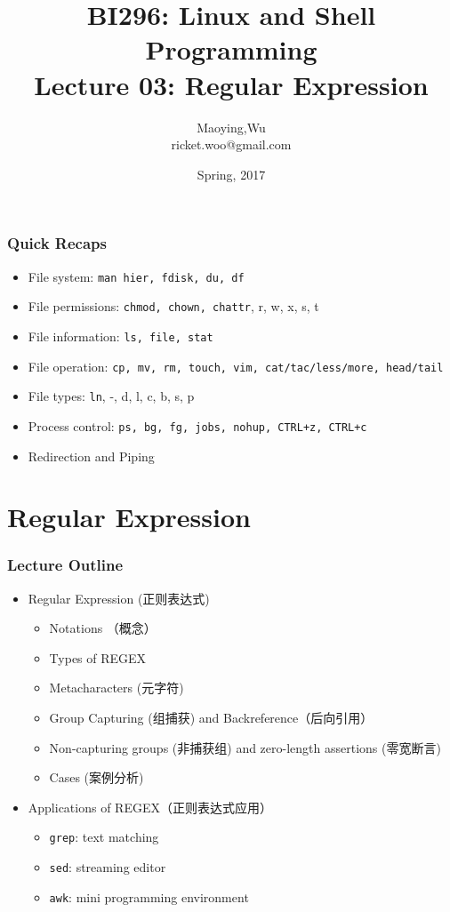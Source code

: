 \documentclass[red]{beamer}
\title[BI296-Lec03]{\tiny{BI296: Linux and Shell Programming}\\
\Large{Lecture 03: Regular Expression}}
\author[Maoying Wu]{Maoying,Wu\\
{\scriptsize ricket.woo@gmail.com}}
\institute[CBB] %
{
  \inst{}
  Dept. of Bioinformatics \& Biostatistics\\
  Shanghai Jiao Tong University
}
\date{Spring, 2017}
\begin{document}
\begin{CJK*}{UTF8}{gbsn}
\frame{\titlepage}

\begin{frame}[containsverbatim]
\frametitle{Quick Recaps}
\begin{itemize}
	\item File system: \lstinline{man hier, fdisk, du, df}
	\item File permissions: \lstinline{chmod, chown, chattr}, r, w, x, s, t
	\item File information: \lstinline{ls, file, stat}
	\item File operation: \lstinline{cp, mv, rm, touch, vim, cat/tac/less/more, head/tail}
	\item File types: \lstinline{ln}, -, d, l, c, b, s, p
	\item Process control: \lstinline{ps, bg, fg, jobs, nohup, CTRL+z, CTRL+c}
	\item Redirection and Piping
\end{itemize}
\end{frame}

\section{Regular Expression}

\begin{frame}
\frametitle{Lecture Outline}
\begin{itemize}
	\item Regular Expression (正则表达式)
	\begin{itemize}
		\item Notations （概念）
		\item Types of REGEX
		\item Metacharacters (元字符)
		\item Group Capturing (组捕获) and Backreference（后向引用）
		\item Non-capturing groups (非捕获组) and zero-length assertions (零宽断言)
		\item Cases (案例分析)
	\end{itemize}
	\vspace{0.2in}
	\item Applications of REGEX（正则表达式应用）
	\begin{itemize}
		\item \lstinline{grep}: text matching
		\item \lstinline{sed}: streaming editor
		\item \lstinline{awk}: mini programming environment
	\end{itemize}
\end{itemize}
\end{frame}


\end{CJK*}
\end{document}
